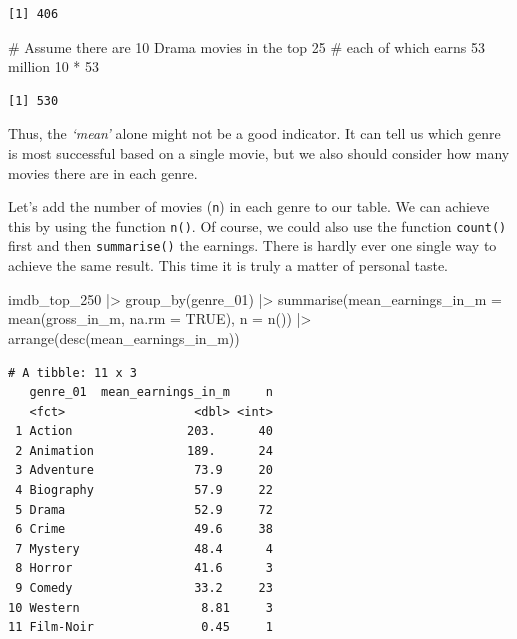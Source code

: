 \documentclass[
  letterpaper,
]{krantz}
\makeatletter
\newenvironment{Shaded}{\begin{snugshade}}{\end{snugshade}}
\newcommand{\AttributeTok}[1]{\textcolor[rgb]{0.40,0.45,0.13}{#1}}
\newcommand{\CommentTok}[1]{\textcolor[rgb]{0.37,0.37,0.37}{#1}}
\newcommand{\ConstantTok}[1]{\textcolor[rgb]{0.56,0.35,0.01}{#1}}
\newcommand{\DecValTok}[1]{\textcolor[rgb]{0.68,0.00,0.00}{#1}}
\newcommand{\FunctionTok}[1]{\textcolor[rgb]{0.28,0.35,0.67}{#1}}
\newcommand{\NormalTok}[1]{\textcolor[rgb]{0.00,0.23,0.31}{#1}}
\newcommand{\SpecialCharTok}[1]{\textcolor[rgb]{0.37,0.37,0.37}{#1}}
\newenvironment{kframe}{%
\medskip{}
\setlength{\fboxsep}{.8em}
 \def\at@end@of@kframe{}%
 \ifinner\ifhmode%
  \def\at@end@of@kframe{\end{minipage}}%
  \begin{minipage}{\columnwidth}%
 \fi\fi%
 \def\FrameCommand##1{\hskip\@totalleftmargin \hskip-\fboxsep
 \colorbox{shadecolor}{##1}\hskip-\fboxsep
     \hskip-\linewidth \hskip-\@totalleftmargin \hskip\columnwidth}%
 \MakeFramed {\advance\hsize-\width
   \@totalleftmargin\z@ \linewidth\hsize
   \@setminipage}}%
 {\par\unskip\endMakeFramed%
 \at@end@of@kframe}
\renewenvironment{Shaded}{\begin{kframe}}{\end{kframe}}
\makeatother
\begin{document}
\begin{verbatim}
[1] 406
\end{verbatim}

\begin{Shaded}
\begin{Highlighting}[]
\CommentTok{\# Assume there are 10 Drama movies in the top 25}
\CommentTok{\# each of which earns 53 million}
\DecValTok{10} \SpecialCharTok{*} \DecValTok{53}
\end{Highlighting}
\end{Shaded}

\begin{verbatim}
[1] 530
\end{verbatim}

Thus, the \emph{`mean'} alone might not be a good indicator. It can tell
us which genre is most successful based on a single movie, but we also
should consider how many movies there are in each genre.

Let's add the number of movies (\texttt{n}) in each genre to our table.
We can achieve this by using the function \texttt{n()}. Of course, we
could also use the function \texttt{count()} first and then
\texttt{summarise()} the earnings. There is hardly ever one single way
to achieve the same result. This time it is truly a matter of personal
taste.

\begin{Shaded}
\begin{Highlighting}[]
\NormalTok{imdb\_top\_250 }\SpecialCharTok{|\textgreater{}}
  \FunctionTok{group\_by}\NormalTok{(genre\_01) }\SpecialCharTok{|\textgreater{}}
  \FunctionTok{summarise}\NormalTok{(}\AttributeTok{mean\_earnings\_in\_m =} \FunctionTok{mean}\NormalTok{(gross\_in\_m, }\AttributeTok{na.rm =} \ConstantTok{TRUE}\NormalTok{),}
            \AttributeTok{n =} \FunctionTok{n}\NormalTok{()) }\SpecialCharTok{|\textgreater{}}
  \FunctionTok{arrange}\NormalTok{(}\FunctionTok{desc}\NormalTok{(mean\_earnings\_in\_m))}
\end{Highlighting}
\end{Shaded}

\begin{verbatim}
# A tibble: 11 x 3
   genre_01  mean_earnings_in_m     n
   <fct>                  <dbl> <int>
 1 Action                203.      40
 2 Animation             189.      24
 3 Adventure              73.9     20
 4 Biography              57.9     22
 5 Drama                  52.9     72
 6 Crime                  49.6     38
 7 Mystery                48.4      4
 8 Horror                 41.6      3
 9 Comedy                 33.2     23
10 Western                 8.81     3
11 Film-Noir               0.45     1
\end{verbatim}
\end{document}
